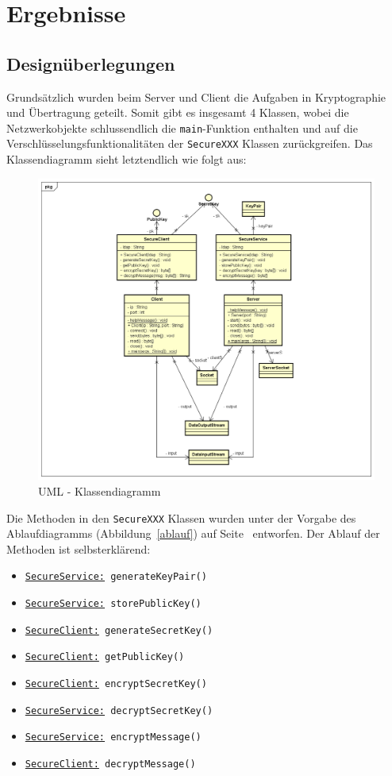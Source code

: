 
\section{Ergebnisse}
\label{sec:Ergebnisse}
\subsection{Designüberlegungen}
Grundsätzlich wurden beim Server und Client die Aufgaben in Kryptographie und Übertragung geteilt. Somit gibt es insgesamt 4 Klassen, wobei die Netzwerkobjekte schlussendlich die \texttt{main}-Funktion enthalten und auf die Verschlüsselungsfunktionalitäten der \texttt{SecureXXX} Klassen zurückgreifen.
Das Klassendiagramm sieht letztendlich wie folgt aus:\

\begin{figure}[!h]
	\begin{center}
		\includegraphics[width=0.9\linewidth]{images/class_diagram.png}
		\caption{UML - Klassendiagramm}
		\label{classd}
	\end{center}
\end{figure}
Die Methoden in den \texttt{SecureXXX} Klassen wurden unter der Vorgabe des Ablaufdiagramms (Abbildung~\ref{ablauf}) auf Seite~\pageref{ablauf} entworfen.
\clearpage
Der Ablauf der Methoden ist selbsterklärend:
\begin{itemize}
	\item \texttt{\underline{SecureService:} generateKeyPair()}
	\item \texttt{\underline{SecureService:} storePublicKey()}
	\item \texttt{\underline{SecureClient:} generateSecretKey()}
	\item \texttt{\underline{SecureClient:} getPublicKey()}
	\item \texttt{\underline{SecureClient:} encryptSecretKey()}
	\item \texttt{\underline{SecureService:} decryptSecretKey()}
	\item \texttt{\underline{SecureService:} encryptMessage()}
	\item \texttt{\underline{SecureClient:} decryptMessage()}
\end{itemize}
